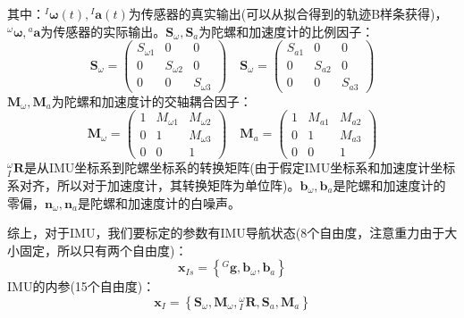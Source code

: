 \documentclass[12pt, twocolumn]{article}
\begin{document}
	其中：${^{I}\boldsymbol{\omega}(t)},{^{I}\boldsymbol{a}(t)}$为传感器的真实输出(可以从拟合得到的轨迹B样条获得)，${^{\omega}\boldsymbol{\omega}},{^{a}\boldsymbol{a}}$为传感器的实际输出。$\boldsymbol{S}_\omega,\boldsymbol{S}_a$为陀螺和加速度计的比例因子：
	\begin{equation*}
		\boldsymbol{S}_\omega=\begin{pmatrix}
			S_{\omega 1}&0&0\\
			0&S_{\omega 2}&0\\
			0&0&S_{\omega 3}
		\end{pmatrix}\quad
	\boldsymbol{S}_\omega=\begin{pmatrix}
		S_{a 1}&0&0\\
		0&S_{a 2}&0\\
		0&0&S_{a 3}
	\end{pmatrix}
	\end{equation*}
	$\boldsymbol{M}_\omega,\boldsymbol{M}_a$为陀螺和加速度计的交轴耦合因子：
	\begin{equation*}
	\boldsymbol{M}_\omega=\begin{pmatrix}
		1&M_{\omega 1}&M_{\omega 2}\\
		0&1&M_{\omega 3}\\
		0&0&1
	\end{pmatrix}\quad
	\boldsymbol{M}_a=\begin{pmatrix}
		1&M_{a 1}&M_{a 2}\\
		0&1&M_{a 3}\\
		0&0&1
	\end{pmatrix}
\end{equation*}
	${^{\omega}_{I}\boldsymbol{R}}$是从IMU坐标系到陀螺坐标系的转换矩阵(由于假定IMU坐标系和加速度计坐标系对齐，所以对于加速度计，其转换矩阵为单位阵)。$\boldsymbol{b}_\omega,\boldsymbol{b}_a$是陀螺和加速度计的零偏，$\boldsymbol{n}_\omega,\boldsymbol{n}_a$是陀螺和加速度计的白噪声。
	
	综上，对于IMU，我们要标定的参数有IMU导航状态(8个自由度，注意重力由于大小固定，所以只有两个自由度)：
	\begin{equation*}
		\boldsymbol{x}_{Is}=\left\lbrace {^{G}\boldsymbol{g},\boldsymbol{b}_\omega,\boldsymbol{b}_a} \right\rbrace 
	\end{equation*}
	IMU的内参(15个自由度)：
	\begin{equation*}
		\boldsymbol{x}_I=\left\lbrace \boldsymbol{S}_\omega,\boldsymbol{M}_\omega,{^{\omega}_{I}\boldsymbol{R}},\boldsymbol{S}_a,\boldsymbol{M}_a \right\rbrace 
	\end{equation*}
	
\end{document}
